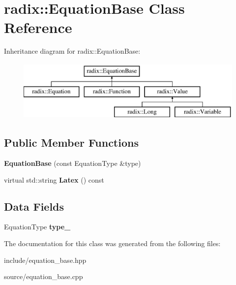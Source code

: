 \hypertarget{classradix_1_1EquationBase}{}\section{radix\+:\+:Equation\+Base Class Reference}
\label{classradix_1_1EquationBase}
Inheritance diagram for radix\+:\+:Equation\+Base\+:\begin{figure}[H]
\begin{center}
\leavevmode
\includegraphics[height=3.000000cm]{classradix_1_1EquationBase}
\end{center}
\end{figure}
\subsection*{Public Member Functions}
\begin{DoxyCompactItemize}
\item 
\mbox{\label{classradix_1_1EquationBase_a88482ba80ce76c683abae39cab450b1b}} 
{\bfseries Equation\+Base} (const Equation\+Type \&type)
\item 
\mbox{\label{classradix_1_1EquationBase_ae251a2185ff420ad61eeb7444bb26e02}} 
virtual std\+::string {\bfseries Latex} () const
\end{DoxyCompactItemize}
\subsection*{Data Fields}
\begin{DoxyCompactItemize}
\item 
\mbox{\label{classradix_1_1EquationBase_a558f49069025e281b98abd8560c80090}} 
Equation\+Type {\bfseries type\+\_\+}
\end{DoxyCompactItemize}


The documentation for this class was generated from the following files\+:\begin{DoxyCompactItemize}
\item 
include/equation\+\_\+base.\+hpp\item 
source/equation\+\_\+base.\+cpp\end{DoxyCompactItemize}
